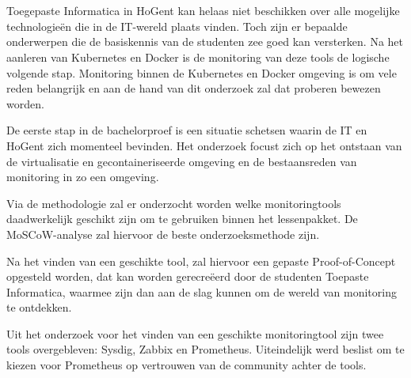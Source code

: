 
\chapter*{}

Toegepaste Informatica in HoGent kan helaas niet beschikken over alle mogelijke technologieën die in de IT-wereld plaats vinden. Toch zijn er bepaalde onderwerpen die de basiskennis van de studenten  zee goed kan versterken. Na het aanleren van Kubernetes en Docker is de monitoring van deze tools de logische volgende stap. Monitoring binnen de Kubernetes en Docker omgeving is om vele reden belangrijk en aan de hand van dit onderzoek zal dat proberen bewezen worden.

De eerste stap in de bachelorproef is een situatie schetsen waarin de IT en HoGent zich momenteel bevinden. Het onderzoek focust zich op het ontstaan van de virtualisatie en gecontaineriseerde omgeving en de bestaansreden van monitoring in zo een omgeving. 

Via de methodologie zal er onderzocht worden welke monitoringtools daadwerkelijk geschikt zijn om te gebruiken binnen het lessenpakket. De MoSCoW-analyse zal hiervoor de beste onderzoeksmethode zijn. 

Na het vinden van een geschikte tool, zal hiervoor een gepaste Proof-of-Concept opgesteld worden, dat kan worden gerecreëerd door de studenten Toepaste Informatica, waarmee zijn dan aan de slag kunnen om de wereld van monitoring te ontdekken. 

Uit het onderzoek voor het vinden van een geschikte monitoringtool zijn twee tools overgebleven: Sysdig, Zabbix en Prometheus. Uiteindelijk werd beslist om te kiezen voor Prometheus op vertrouwen van de community achter de tools. 